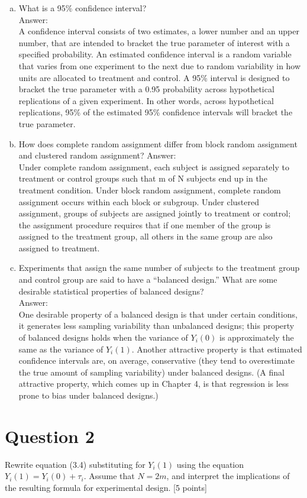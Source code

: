 \documentclass[11pt,notitlepage]{article}\usepackage[]{graphicx}\usepackage[]{color}
\begin{document}
\begin{enumerate}[a)]
\item What is a 95\% confidence interval?  \\
Answer:\\ 
A confidence interval consists of two estimates, a lower number and an upper number, that are intended to bracket the true parameter of interest with a specified probability. An estimated confidence interval is a random variable that varies from one experiment to the next due to random variability in how units are allocated to treatment and control. A 95\% interval is designed to bracket the true parameter with a 0.95 probability across hypothetical replications of a given experiment.  In other words, across hypothetical replications, 95\% of the estimated 95\% confidence intervals will bracket the true parameter.  
\item How does complete random assignment differ from block random assignment and clustered random assignment?
Answer:\\
Under complete random assignment, each subject is assigned separately to treatment or control groups such that m of N subjects end up in the treatment condition. Under block random assignment, complete random assignment occurs within each block or subgroup. Under clustered assignment, groups of subjects are assigned jointly to treatment or control; the assignment procedure requires that if one member of the group is assigned to the treatment group, all others in the same group are also assigned to treatment. 
\item Experiments that assign the same number of subjects to the treatment group and control group are said to have a ``balanced design.''  What are some desirable statistical properties of balanced designs?\\
Answer:\\
One desirable property of a balanced design is that under certain conditions, it generates less sampling variability than unbalanced designs; this property of balanced designs holds when the variance of $Y_i(0)$ is approximately the same as the variance of $Y_i (1)$. Another attractive property is that estimated confidence intervals are, on average, conservative (they tend to overestimate the true amount of sampling variability) under balanced designs. (A final attractive property, which comes up in Chapter 4, is that regression is less prone to bias under balanced designs.)
\end{enumerate}

\section*{Question 2}
Rewrite equation (3.4) substituting for $Y_i (1)$ using the equation $Y_i (1) = Y_i (0) + \tau_i$.  Assume that $N=2m$, and interpret the implications of the resulting formula for experimental design. [5 points]
\end{document}
